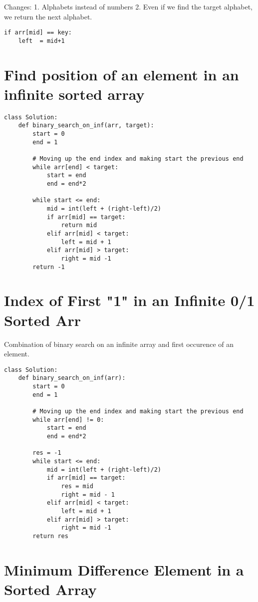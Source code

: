 \documentclass[24pt, a4]{article}
\begin{document}
Changes:
1. Alphabets instead of numbers
2. Even if we find the target alphabet, we return the next alphabet.
\begin{lstlisting}
if arr[mid] == key:
    left  = mid+1
\end{lstlisting}

\newpage
\section{Find position of an element in an infinite sorted array}
\begin{lstlisting}
class Solution:
    def binary_search_on_inf(arr, target):
        start = 0
        end = 1

        # Moving up the end index and making start the previous end
        while arr[end] < target:
            start = end
            end = end*2
        
        while start <= end:
            mid = int(left + (right-left)/2)
            if arr[mid] == target:
                return mid
            elif arr[mid] < target:
                left = mid + 1
            elif arr[mid] > target:
                right = mid -1
        return -1
\end{lstlisting}

\newpage
\section{Index of First "1" in an Infinite 0/1 Sorted Arr}

Combination of binary search on an infinite array and first occurence of an
element.
\begin{lstlisting}
class Solution:
    def binary_search_on_inf(arr):
        start = 0
        end = 1

        # Moving up the end index and making start the previous end
        while arr[end] != 0:
            start = end
            end = end*2
        
        res = -1
        while start <= end:
            mid = int(left + (right-left)/2)
            if arr[mid] == target:
                res = mid
                right = mid - 1
            elif arr[mid] < target:
                left = mid + 1
            elif arr[mid] > target:
                right = mid -1
        return res
\end{lstlisting}

\newpage
\section{Minimum Difference Element in a Sorted Array}
\end{document}
